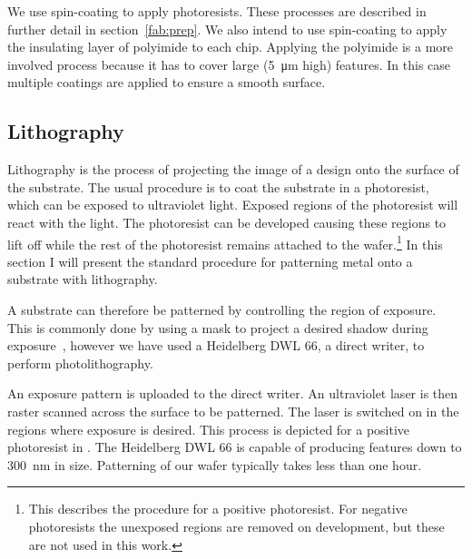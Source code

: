 We use spin-coating to apply photoresists. These processes are described in
further detail in section~\ref{fab:prep}. We also intend to use spin-coating
to apply the insulating layer of polyimide to each chip. Applying the
polyimide is a more involved process because it has to cover large
(\SI{5}{\micro\meter} high) features. In this case multiple coatings are
applied to ensure a smooth surface. 

\subsection{Lithography}

Lithography is the process of projecting the image of a design onto the surface
of the substrate. The usual procedure is to coat the substrate in a
photoresist, which can be exposed to ultraviolet light. Exposed regions of the
photoresist will react with the light. The photoresist can be developed causing
these regions to lift off while the rest of the photoresist remains attached to
the wafer.\footnote{This describes the procedure for a positive photoresist.
For negative photoresists the unexposed regions are removed on development, but
these are not used in this work.} In this section I will present the standard
procedure for patterning metal onto a substrate with
lithography.~\cite{Madou2002}

A substrate can therefore be patterned by controlling the region of
exposure. This is commonly done by using a mask to project a desired shadow
during exposure~\cite{Madou2002}, however we have used a Heidelberg DWL 66, a
direct writer,
to perform photolithography.
%

An exposure pattern is uploaded to the direct writer. An ultraviolet laser is
then raster scanned across the surface to be patterned. The laser is switched
on in the regions where exposure is desired. This process is depicted for a
positive photoresist in . The Heidelberg DWL 66 is
capable of producing features down to \SI{300}{\nano\meter} in size.
Patterning of our wafer typically takes less than one hour.

